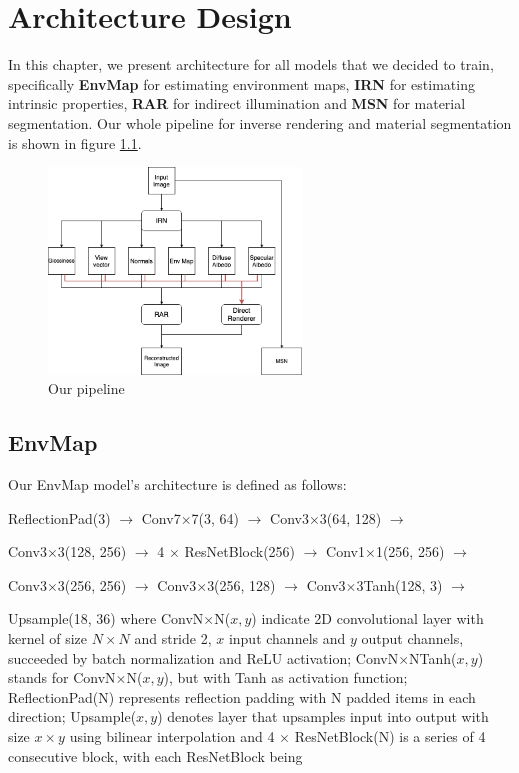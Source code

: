 \chapter{Architecture Design}
\label{kap:architecture_design}

In this chapter, we present architecture for all models that we decided to train, specifically \textbf{EnvMap} for estimating environment maps, \textbf{IRN} for estimating intrinsic properties, \textbf{RAR} for indirect illumination  and \textbf{MSN} for material segmentation. Our whole pipeline for inverse rendering and material segmentation is shown in figure \ref{img:architecture}.
\begin{figure}[H]
    \centerline{\includegraphics[width=0.6\textwidth]{praca/images/MaterialPicker-network-architecture.png}}
    \caption[Our pipeline]{Our pipeline}
    \label{img:architecture}
\end{figure}
\section{EnvMap}
\label{sec:env-map-architecture}
Our EnvMap model's architecture is defined as follows:
\newline

ReflectionPad(3) $\to$ Conv7$\times$7(3, 64) $\to$ Conv3$\times$3(64, 128) $\to$

Conv3$\times$3(128, 256) $\to$ 4 $\times$ ResNetBlock(256) $\to$ Conv1$\times$1(256, 256) $\to$ 

Conv3$\times$3(256, 256) $\to$ Conv3$\times$3(256, 128) $\to$ Conv3$\times$3Tanh(128, 3) $\to$ 

Upsample(18, 36)
\newline
\newline
where ConvN$\times$N($x, y$) indicate 2D convolutional layer with kernel of size $N \times N$ and stride 2, $x$ input channels and $y$ output channels, succeeded by batch normalization and ReLU activation; ConvN$\times$NTanh($x, y$) stands for ConvN$\times$N($x, y$), but with Tanh as activation function; ReflectionPad(N) represents reflection padding with N padded items in each direction; Upsample($x, y$) denotes layer that upsamples input into output with size $x \times y$ using bilinear interpolation and 4 $\times$ ResNetBlock(N) is a series of 4 consecutive block, with each ResNetBlock being
\newline

